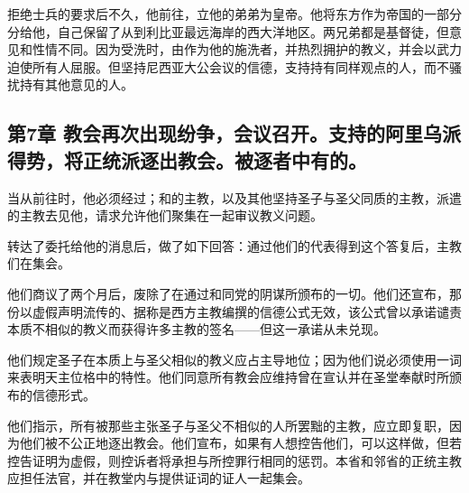 拒绝士兵的要求后不久，他前往，立他的弟弟为皇帝。他将东方作为帝国的一部分分给他，自己保留了从到利比亚最远海岸的西大洋地区。两兄弟都是基督徒，但意见和性情不同。因为受洗时，由作为他的施洗者，并热烈拥护的教义，并会以武力迫使所有人屈服。但坚持尼西亚大公会议的信德，支持持有同样观点的人，而不骚扰持有其他意见的人。\par


\subsection{第7章 教会再次出现纷争，会议召开。支持的阿里乌派得势，将正统派逐出教会。被逐者中有的。}

当从前往时，他必须经过；和的主教，以及其他坚持圣子与圣父同质的主教，派遣的主教去见他，请求允许他们聚集在一起审议教义问题。\par

转达了委托给他的消息后，做了如下回答：通过他们的代表得到这个答复后，主教们在集会。\par

他们商议了两个月后，废除了在通过和同党的阴谋所颁布的一切。他们还宣布，那份以虚假声明流传的、据称是西方主教编撰的信德公式无效，该公式曾以承诺谴责本质不相似的教义而获得许多主教的签名——但这一承诺从未兑现。\par

他们规定圣子在本质上与圣父相似的教义应占主导地位；因为他们说必须使用一词来表明天主位格中的特性。他们同意所有教会应维持曾在宣认并在圣堂奉献时所颁布的信德形式。\par

他们指示，所有被那些主张圣子与圣父不相似的人所罢黜的主教，应立即复职，因为他们被不公正地逐出教会。他们宣布，如果有人想控告他们，可以这样做，但若控告证明为虚假，则控诉者将承担与所控罪行相同的惩罚。本省和邻省的正统主教应担任法官，并在教堂内与提供证词的证人一起集会。\par

